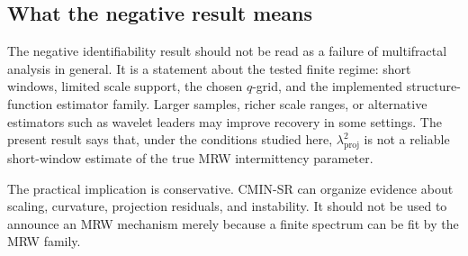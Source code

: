 \subsection{What the negative result means}

The negative identifiability result should not be read as a failure of
multifractal analysis in general. It is a statement about the tested finite
regime: short windows, limited scale support, the chosen \(q\)-grid, and the
implemented structure-function estimator family. Larger samples, richer scale
ranges, or alternative estimators such as wavelet leaders may improve recovery
in some settings. The present result says that, under the conditions studied
here, \(\lambda^2_{\mathrm{proj}}\) is not a reliable short-window estimate of
the true MRW intermittency parameter.

The practical implication is conservative. CMIN-SR can organize evidence about
scaling, curvature, projection residuals, and instability. It should not be
used to announce an MRW mechanism merely because a finite spectrum can be fit
by the MRW family.
